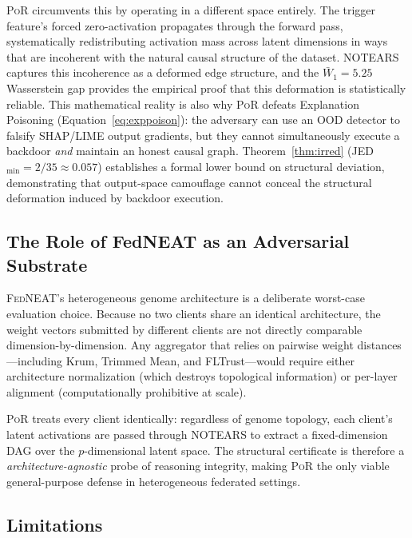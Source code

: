 \documentclass[journal]{IEEEtran}
\newcommand{\por}{\textsc{PoR}}
\newcommand{\fedneat}{\textsc{FedNEAT}}
\newcommand{\notears}{\textsc{NOTEARS}}
\begin{document}
\por{} circumvents this by operating in a different space entirely.
The trigger feature's forced zero-activation propagates through the forward
pass, systematically redistributing activation mass across latent dimensions
in ways that are incoherent with the natural causal structure of the
dataset. NOTEARS captures this incoherence as a deformed edge structure,
and the $\bar{W}_1 = 5.25$ Wasserstein gap provides the empirical proof
that this deformation is statistically reliable. This mathematical reality
is also why \por{} defeats Explanation Poisoning (Equation~\ref{eq:exppoison}):
the adversary can use an OOD detector to falsify SHAP/LIME output gradients,
but they cannot simultaneously execute a backdoor \textit{and} maintain an
honest causal graph. Theorem~\ref{thm:irred} (JED$_{\min} = 2/35 \approx 0.057$)
establishes a formal lower bound on structural deviation,
demonstrating that output-space camouflage cannot conceal the
structural deformation induced by backdoor execution.

\subsection{The Role of FedNEAT as an Adversarial Substrate}

\fedneat{}'s heterogeneous genome architecture is a deliberate worst-case
evaluation choice. Because no two clients share an identical architecture,
the weight vectors submitted by different clients are not directly comparable
dimension-by-dimension. Any aggregator that relies on pairwise weight
distances---including Krum, Trimmed Mean, and FLTrust---would require
either architecture normalization (which destroys topological information)
or per-layer alignment (computationally prohibitive at scale).

\por{} treats every client identically: regardless of genome topology,
each client's latent activations are passed through \notears{} to extract a
fixed-dimension DAG over the $p$-dimensional latent space. The structural
certificate is therefore a \textit{architecture-agnostic} probe of
reasoning integrity, making \por{} the only viable general-purpose defense
in heterogeneous federated settings.

\subsection{Limitations}
\end{document}
